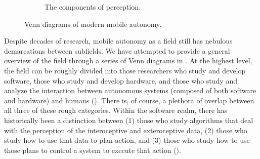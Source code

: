 \begin{figure}
\begin{subfigure}[b]{0.3\textwidth}
        \caption{The components of perception.}
         \label{fig:intro_perception_venn}
 \end{subfigure}
        \caption{Venn diagrams of modern mobile autonomy.}
        \label{fig:intro_three_venn}
\end{figure}

 
 Despite decades of research, mobile autonomy as a field still has nebulous demarcations between subfields. We have attempted to provide a general overview of the field through a series of Venn diagrams in .  At the highest level, the field can be roughly divided into those researchers who study and develop software, those who study and develop hardware, and those who study and analyze the interaction between autonomous systems (composed of both software and hardware) and humans (). There is, of course, a plethora of overlap between all three of these rough categories. Within the software realm, there has historically been a distinction between (1) those who study algorithms that deal with the perception of the interoceptive and exteroceptive data, (2) those who study how to use that data to plan action, and (3) those who study how to use those plans to control a system to execute that action (). 
 
 
